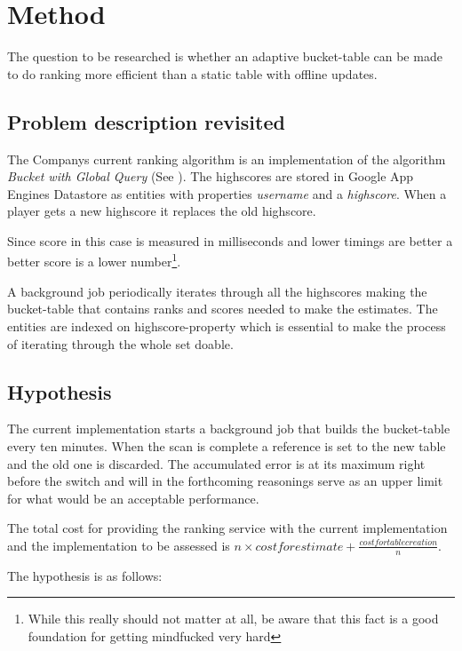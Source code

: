 \chapter{\label{method}Method}

The question to be researched is whether an adaptive bucket-table can be made to do ranking more efficient than a static table with offline updates.

\section{Problem description revisited}

The Companys current ranking algorithm is an implementation of the algorithm \emph{Bucket with Global Query} (See ). The highscores are stored in Google App Engines Datastore as entities with properties \emph{username} and a \emph{highscore}. When a player gets a new highscore it replaces the old highscore.

Since score in this case is measured in milliseconds and lower timings are better a better score is a lower number\footnote{While this really should not matter at all, be aware that this fact is a good foundation for getting mindfucked very hard}.

A background job  periodically iterates through all the highscores making the bucket-table that contains ranks and scores needed to make the estimates. The entities are indexed on highscore-property which is essential to make the process of iterating through the whole set doable.

\section{Hypothesis} 

The current implementation starts a background job that builds the bucket-table every ten minutes. When the scan is complete a reference is set to the new table and the old one is discarded. The accumulated error is at its maximum right before the switch and will in the forthcoming reasonings serve as an upper limit for what would be an acceptable performance.

The total cost for providing the ranking service with the current implementation and the implementation to be assessed is $n \times costforestimate + \frac{ costfortablecreation}{n}$.


The hypothesis is as follows:

